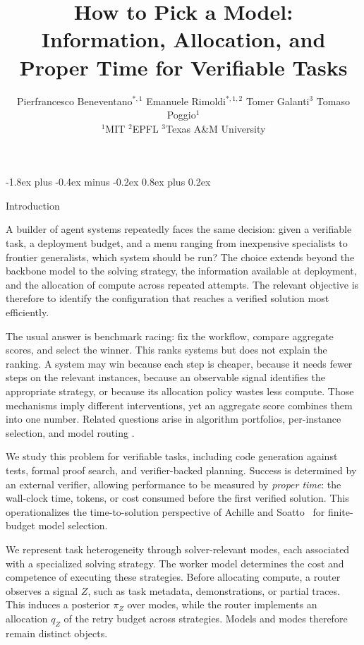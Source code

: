 \documentclass[10pt,twocolumn]{article}
\title{How to Pick a Model:\\
Information, Allocation, and Proper Time for Verifiable Tasks}
\author{%
  Pierfrancesco Beneventano$^{*,1}$ \quad
  Emanuele Rimoldi$^{*,1,2}$ \quad
  Tomer Galanti$^3$ \quad
  Tomaso Poggio$^1$ \\
  $^1$MIT \quad $^2$EPFL \quad $^3$Texas A\&M University
}
\date{}
\makeatletter
\theoremstyle{paperplain}
\theoremstyle{paperdefinition}
\theoremstyle{paperremark}
\renewcommand{\section}{%
  \@startsection{section}{1}{\z@}%
    {-1.8ex plus -0.4ex minus -0.2ex}%
    {0.8ex plus 0.2ex}%
    {\normalfont\large\bfseries\raggedright}}
\makeatother
\begin{document}
\maketitle

\section{Introduction}
\label{sec:intro}

A builder of agent systems repeatedly faces the same decision: given a
verifiable task, a deployment budget, and a menu ranging from inexpensive
specialists to frontier generalists, which system should be run? The choice
extends beyond the backbone model to the solving strategy, the information
available at deployment, and the allocation of compute across repeated
attempts. The relevant objective is therefore to identify the configuration
that reaches a verified solution most efficiently.

The usual answer is benchmark racing: fix the workflow, compare aggregate
scores, and select the winner. This ranks systems but does not explain the
ranking. A system may win because each step is cheaper, because it needs fewer
steps on the relevant instances, because an observable signal identifies the
appropriate strategy, or because its allocation policy wastes less compute.
Those mechanisms imply different interventions, yet an aggregate score combines
them into one number. Related questions arise in algorithm portfolios,
per-instance selection, and model routing
\citep{gomes-selman2001,xu_hutter_hoos_leytonbrown_2008_satzilla,
chen2023frugalgpt,ong2024routellm}.

We study this problem for verifiable tasks, including code generation against
tests, formal proof search, and verifier-backed planning. Success is determined
by an external verifier, allowing performance to be measured by \emph{proper
time}: the wall-clock time, tokens, or cost consumed before the first verified
solution. This operationalizes the time-to-solution perspective of Achille and
Soatto~\citep{achille2026} for finite-budget model selection.

We represent task heterogeneity through solver-relevant modes, each associated
with a specialized solving strategy. The worker model determines the cost and
competence of executing these strategies. Before allocating compute, a router
observes a signal $Z$, such as task metadata, demonstrations, or partial
traces. This induces a posterior $\pi_Z$ over modes, while the router implements
an allocation $q_Z$ of the retry budget across strategies. Models and modes
therefore remain distinct objects.
\end{document}
